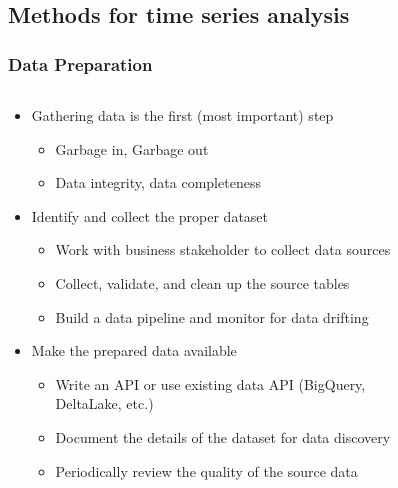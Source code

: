 \documentclass[aspectratio=169,xcolor=x11names,table]{beamer}
\begin{document}

\subsection{Methods for time series analysis}

\begin{frame}
	\frametitle{Data Preparation}
	\begin{columns}
		\begin{column}{0.7\linewidth}
			\begin{itemize}
				\item<1> Gathering data is the first (most important) step
					\begin{itemize}
						\only\item Garbage in, Garbage out 
						\item Data integrity, data completeness
					\end{itemize}
				\vspace{3mm}
				\item<2> Identify and collect the proper dataset
					\begin{itemize}
						\item Work with business stakeholder to collect data sources
						\item Collect, validate, and clean up the source tables
						\item Build a data pipeline and monitor for data drifting
					\end{itemize}
				\vspace{3mm}
				\item<3> Make the prepared data available
					\begin{itemize}
						\item Write an API or use existing data API (BigQuery, DeltaLake, etc.)
						\item Document the details of the dataset for data discovery
						\item Periodically review the quality of the source data
					\end{itemize}
			\end{itemize}
		\end{column}
		\hfill
		\begin{column}{0.3\linewidth}
			\begin{figure}
				\centering

\end{figure}
\end{column}
\end{columns}
\end{frame}
\end{document}

